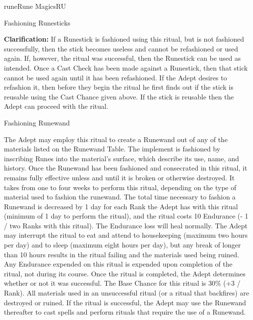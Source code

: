 \begin{college}[1.1]{rune}{Rune Magics}{RU}
\begin{ritual}[Q-1]{Fashioning Runesticks}
\begin{effects}
\textbf{Clarification:}
If a Runestick is fashioned using this ritual, but is not fashioned
successfully, then the stick becomes useless and cannot be refashioned
or used again. If, however, the ritual was successful, then the
Runestick can be used as intended.  Once a Cast Check has been made
against a Runestick, then that stick cannot be used again until it has
been refashioned.  If the Adept desires to refashion it, then before
they begin the ritual he first finds out if the stick is reusable
using the Cast Chance given above. If the stick is reusable then the
Adept can proceed with the ritual.
\end{effects}
\end{ritual}

\begin{ritual}[Q-2]{Fashioning Runewand}

\begin{effects}
The Adept may employ this ritual to create a Runewand out of any of
the materials listed on the Runewand Table.  The implement is
fashioned by inscribing Runes into the material's surface, which
describe its use, name, and history. Once the Runewand has been
fashioned and consecrated in this ritual, it remains fully effective
unless and until it is broken or otherwise destroyed.  It takes from
one to four weeks to perform this ritual, depending on the type of
material used to fashion the runewand.  The total time necessary to
fashion a Runewand is decreased by 1 day for each Rank the Adept has
with this ritual (minimum of 1 day to perform the ritual), and the
ritual costs 10 Endurance (- 1 / two Ranks with this ritual). The
Endurance loss will heal normally.  The Adept may interrupt the ritual
to eat and attend to housekeeping (maximum two hours per day) and to
sleep (maximum eight hours per day), but any break of longer than 10
hours results in the ritual failing and the materials used being
ruined. Any Endurance expended on this ritual is expended upon
completion of the ritual, not during its course.  Once the ritual is
completed, the Adept determines whether or not it was successful. The
Base Chance for this ritual is 30\% (+3 / Rank).  All materials used
in an unsuccessful ritual (or a ritual that backfires) are destroyed
or ruined. If the ritual is successful, the Adept may use the Runewand
thereafter to cast spells and perform rituals that require the use of
a Runewand.


\end{effects}
\end{ritual}
\end{college}

